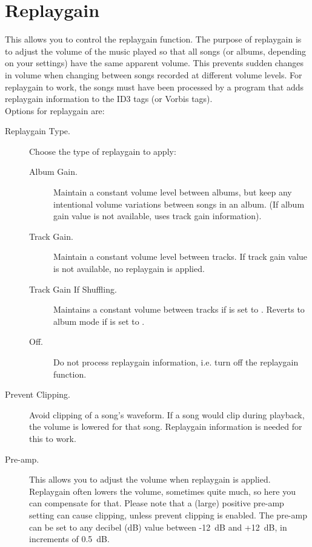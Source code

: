 \section{\label{ref:ReplayGain}Replaygain}
  This allows you to control the replaygain function.
  The purpose of replaygain is to adjust the volume of the music played
  so that all songs (or albums, depending on your settings) have the
  same apparent volume. This prevents sudden changes in volume when
  changing between songs recorded at different volume levels.
  For replaygain to work, the songs must have been processed by a program
  that adds replaygain information to the ID3 tags (or Vorbis tags).\\
      
  Options for replaygain are:
  \begin{description}
    \item[Replaygain Type.] Choose the type of replaygain to apply:
      \begin{description}
      \item[Album Gain.] Maintain a constant volume level between
        albums, but keep any intentional volume variations between 
        songs in an album. (If album gain value is not available,
        uses track gain information).
      \item[Track Gain.] Maintain a constant volume level between
        tracks. If track gain value is not available, no replaygain 
        is applied.
      \item[Track Gain If Shuffling.] Maintains a constant volume
        between tracks if  is set to .
        Reverts to album mode if  is set to .
      \item[Off.] Do not process replaygain information, i.e. turn off
        the replaygain function.
      \end{description}
    \item[Prevent Clipping.] Avoid clipping of a song's waveform.
      If a song would clip during playback, the volume is lowered for 
      that song. Replaygain information is needed for this to work.
    \item[Pre-amp.] This allows you to adjust the volume when replaygain
      is applied. Replaygain often lowers the volume, sometimes quite
      much, so here you can compensate for that. Please note that a
      (large) positive pre-amp setting can cause clipping, unless
      prevent clipping is enabled.  The pre-amp can be set to any
      decibel (dB) value between -12~dB and +12~dB, in increments of 0.5~dB.
    \end{description}

